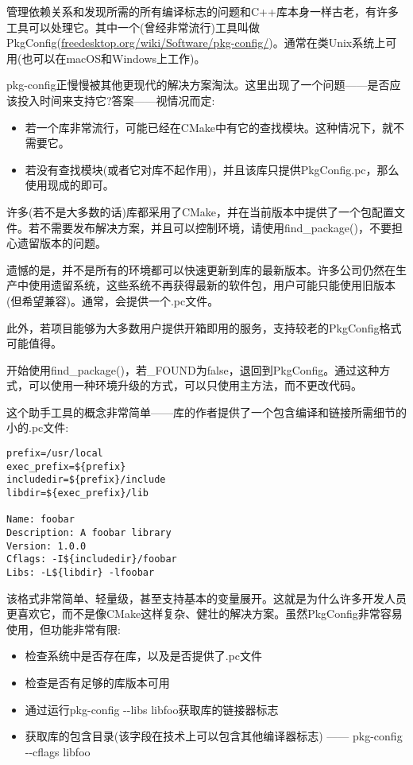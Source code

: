 管理依赖关系和发现所需的所有编译标志的问题和C++库本身一样古老，有许多工具可以处理它。其中一个(曾经非常流行)工具叫做PkgConfig(\url{freedesktop.org/wiki/Software/pkg-config/})。通常在类Unix系统上可用(也可以在macOS和Windows上工作)。

pkg-config正慢慢被其他更现代的解决方案淘汰。这里出现了一个问题——是否应该投入时间来支持它?答案——视情况而定:

\begin{itemize}
\item 
若一个库非常流行，可能已经在CMake中有它的查找模块。这种情况下，就不需要它。

\item 
若没有查找模块(或者它对库不起作用)，并且该库只提供PkgConfig.pc，那么使用现成的即可。
\end{itemize}

许多(若不是大多数的话)库都采用了CMake，并在当前版本中提供了一个包配置文件。若不需要发布解决方案，并且可以控制环境，请使用find\_package()，不要担心遗留版本的问题。

遗憾的是，并不是所有的环境都可以快速更新到库的最新版本。许多公司仍然在生产中使用遗留系统，这些系统不再获得最新的软件包，用户可能只能使用旧版本(但希望兼容)。通常，会提供一个.pc文件。

此外，若项目能够为大多数用户提供开箱即用的服务，支持较老的PkgConfig格式可能值得。

开始使用find\_package()，若\_FOUND为false，退回到PkgConfig。通过这种方式，可以使用一种环境升级的方式，可以只使用主方法，而不更改代码。

这个助手工具的概念非常简单——库的作者提供了一个包含编译和链接所需细节的小的.pc文件:

\begin{lstlisting}[style=styleCMake]
prefix=/usr/local
exec_prefix=${prefix}
includedir=${prefix}/include
libdir=${exec_prefix}/lib

Name: foobar
Description: A foobar library
Version: 1.0.0
Cflags: -I${includedir}/foobar
Libs: -L${libdir} -lfoobar
\end{lstlisting}

该格式非常简单、轻量级，甚至支持基本的变量展开。这就是为什么许多开发人员更喜欢它，而不是像CMake这样复杂、健壮的解决方案。虽然PkgConfig非常容易使用，但功能非常有限:

\begin{itemize}
\item 
检查系统中是否存在库，以及是否提供了.pc文件

\item 
检查是否有足够的库版本可用

\item 
通过运行pkg-config -{}-libs libfoo获取库的链接器标志

\item 
获取库的包含目录(该字段在技术上可以包含其他编译器标志) ——  pkg-config -{}-cflags libfoo
\end{itemize}

